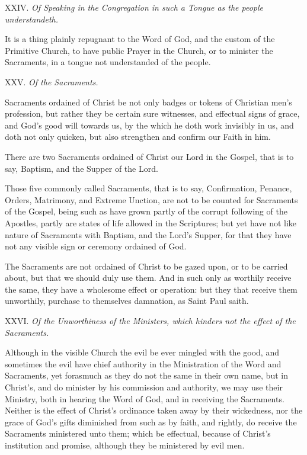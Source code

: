 XXIV.
\emph{Of Speaking in the Congregation in such a Tongue as the people understandeth.}

It
is a thing plainly repugnant to the Word of God, and the custom of the
Primitive Church, to have public Prayer in the Church, or to minister
the Sacraments, in a tongue not understanded of the people.

XXV. \emph{Of the Sacraments.}

Sacraments
ordained of Christ be not only badges or tokens of Christian men’s
profession, but rather they be certain sure witnesses, and effectual signs
of grace, and God’s good will towards us, by the which he doth work
invisibly in us, and doth not only quicken, but also strengthen and confirm
our Faith in him.

There are two Sacraments ordained of Christ our Lord
in the Gospel, that is to say, Baptism, and the Supper of the Lord.

Those five commonly called Sacraments, that is to say,
Confirmation, Penance, Orders, Matrimony, and Extreme Unction, are not
to be counted for Sacraments of the Gospel, being such as have grown partly
of the corrupt following of the Apostles, partly are states of life allowed
in the Scriptures; but yet have not like nature of Sacraments with Baptism,
and the Lord’s Supper, for that they have not any visible sign or
ceremony ordained of God.

The Sacraments are not ordained of Christ to be gazed
upon, or to be carried about, but that we should duly use them. And in
such only as worthily receive the same, they have a wholesome effect or
operation: but they that receive them unworthily, purchase to themselves
damnation, as Saint Paul saith.

XXVI.
\emph{Of the Unworthiness of the Ministers, which hinders not the effect
of the Sacraments.}

Although
in the visible Church the evil be ever mingled with the good, and sometimes
the evil have chief authority in the Ministration of the Word and Sacraments,
yet forasmuch as they do not the same in their own name, but in Christ's,
and do minister by his commission and authority, we may use their Ministry,
both in hearing the Word of God, and in receiving the Sacraments. Neither
is the effect of Christ's ordinance taken away by their wickedness, nor
the grace of God’s gifts diminished from such as by faith, and rightly,
do receive the Sacraments ministered unto them; which be effectual, because
of Christ’s institution and promise, although they be ministered
by evil men.

